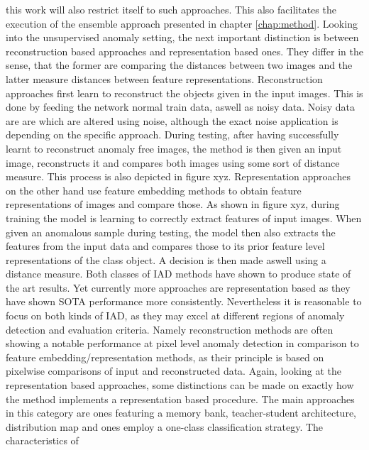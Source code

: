 this work will also restrict itself to such approaches. This also facilitates the execution of the ensemble approach presented in chapter \ref{chap:method}.
\newline
Looking into the unsupervised anomaly setting, the next important distinction is between reconstruction based approaches and representation based ones. They differ in the sense, that the former 
are comparing the distances between two images and the latter measure distances between feature representations. \newline
Reconstruction approaches first learn to reconstruct the objects given in the input images. This is done by feeding the network normal train data, aswell as noisy data. Noisy data are are 
which are altered using noise, although the exact noise application is depending on the specific approach. During testing, after having successfully learnt to 
reconstruct anomaly free images, the method is then given an input image, reconstructs it and compares both images using some sort of distance measure. This process is also depicted in figure xyz. 
Representation approaches on the other hand use feature embedding methods to obtain feature representations of images and compare those. As shown in figure xyz, during training the model is 
learning to correctly extract features of input images. When given an anomalous sample during testing, the model then also extracts the features from the input data and compares those to its 
prior feature level representations of the class object. A decision is then made aswell using a distance measure.
Both classes of IAD methods have shown to produce state of the art results. Yet currently more approaches are representation based \cite{liu2024deep} as they have shown SOTA performance more 
consistently. Nevertheless it is reasonable to focus on both kinds of IAD, as they may excel at different regions of anomaly detection and evaluation criteria. Namely reconstruction methods are 
often showing a notable performance at pixel level anomaly detection in comparison to feature embedding/representation methods, as their principle is based on pixelwise comparisons of input 
and reconstructed data.
\newline
Again, looking at the representation based approaches, some distinctions can be made on exactly how the method implements a representation based procedure.
The main approaches in this category are ones featuring a memory bank, teacher-student architecture, distribution map and ones employ a one-class classification strategy. The characteristics of 

